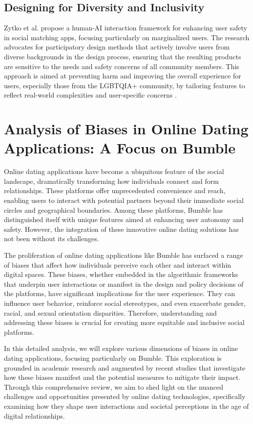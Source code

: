 \subsection{Designing for Diversity and Inclusivity}
Zytko et al. propose a human-AI interaction framework for enhancing user safety in social matching apps, focusing particularly on marginalized users. The research advocates for participatory design methods that actively involve users from diverse backgrounds in the design process, ensuring that the resulting products are sensitive to the needs and safety concerns of all community members. This approach is aimed at preventing harm and improving the overall experience for users, especially those from the LGBTQIA+ community, by tailoring features to reflect real-world complexities and user-specific concerns \cite{Zytko_Furlo_Aljasim_2021}.

\section{Analysis of Biases in Online Dating Applications: A Focus on Bumble}
Online dating applications have become a ubiquitous feature of the social landscape, dramatically transforming how individuals connect and form relationships. These platforms offer unprecedented convenience and reach, enabling users to interact with potential partners beyond their immediate social circles and geographical boundaries. Among these platforms, Bumble has distinguished itself with unique features aimed at enhancing user autonomy and safety. However, the integration of these innovative online dating solutions has not been without its challenges.

The proliferation of online dating applications like Bumble has surfaced a range of biases that affect how individuals perceive each other and interact within digital spaces. These biases, whether embedded in the algorithmic frameworks that underpin user interactions or manifest in the design and policy decisions of the platforms, have significant implications for the user experience. They can influence user behavior, reinforce social stereotypes, and even exacerbate gender, racial, and sexual orientation disparities. Therefore, understanding and addressing these biases is crucial for creating more equitable and inclusive social platforms.

In this detailed analysis, we will explore various dimensions of biases in online dating applications, focusing particularly on Bumble. This exploration is grounded in academic research and augmented by recent studies that investigate how these biases manifest and the potential measures to mitigate their impact. Through this comprehensive review, we aim to shed light on the nuanced challenges and opportunities presented by online dating technologies, specifically examining how they shape user interactions and societal perceptions in the age of digital relationships.

